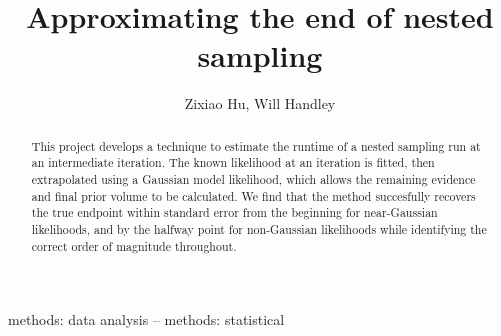 \documentclass[usenatbib]{mnras}
\title[Approximating the end of nested sampling]{Approximating the end of nested sampling}
\author[Z. Hu]{Zixiao Hu, Will Handley}
\begin{document}
\label{firstpage}
\pagerange{\pageref{firstpage}--\pageref{lastpage}}
\maketitle


\begin{abstract}
This project develops a technique to estimate the runtime of a nested sampling run at an intermediate iteration. The known likelihood at an iteration is fitted, then extrapolated using a Gaussian model likelihood, which allows the remaining evidence and final prior volume to be calculated. We find that the method succesfully recovers the true endpoint within standard error from the beginning for near-Gaussian likelihoods, and by the halfway point for non-Gaussian likelihoods while identifying the correct order of magnitude throughout. 
\end{abstract}

\begin{keywords}
methods: data analysis -- methods: statistical
\end{keywords}
\end{document}
